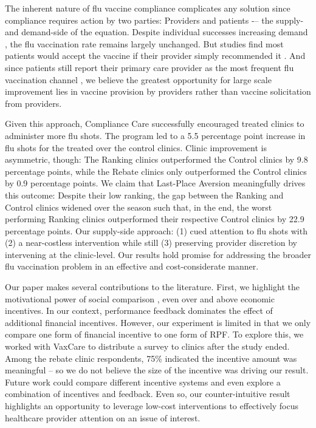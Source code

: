  The inherent nature of flu vaccine compliance complicates any solution since compliance requires action by two parties: Providers and patients -– the supply- and demand-side of the equation. Despite individual successes increasing demand \citep[e.g.,][]{Milkman2011}, the flu vaccination rate remains largely unchanged. But studies find most patients would accept the vaccine if their provider simply recommended it \citep{Patel2017}. And since patients still report their primary care provider as the most frequent flu vaccination channel \citep[48\%, per][]{CVSHealth2018}, we believe the greatest opportunity for large scale improvement lies in vaccine provision by providers rather than vaccine solicitation from providers. 
 
 Given this approach, Compliance Care successfully encouraged treated clinics to administer more flu shots. The program led to a 5.5 percentage point increase in flu shots for the treated over the control clinics. Clinic improvement is asymmetric, though: The Ranking clinics outperformed the Control clinics by 9.8 percentage points, while the Rebate clinics only outperformed the Control clinics by 0.9 percentage points. We claim that Last-Place Aversion meaningfully drives this outcome: Despite their low ranking, the gap between the Ranking and Control clinics widened over the season such that, in the end, the worst performing Ranking clinics outperformed their respective Control clinics by 22.9 percentage points. Our supply-side approach: (1) cued attention to flu shots with (2) a near-costless intervention while still (3) preserving provider discretion by intervening at the clinic-level. Our results hold promise for addressing the broader flu vaccination problem in an effective and cost-considerate manner.
 
 Our paper makes several contributions to the literature. First, we highlight the motivational power of social comparison \citep{Festinger1954}, even over and above economic incentives. In our context, performance feedback dominates the effect of additional financial incentives. However, our experiment is limited in that we only compare one form of financial incentive to one form of RPF. To explore this, we worked with VaxCare to distribute a survey to clinics after the study ended. Among the rebate clinic respondents, 75\% indicated the incentive amount was meaningful – so we do not believe the size of the incentive was driving our result. Future work could compare different incentive systems and even explore a combination of incentives and feedback. Even so, our counter-intuitive result highlights an opportunity to leverage low-cost interventions to effectively focus healthcare provider attention on an issue of interest. 
 
